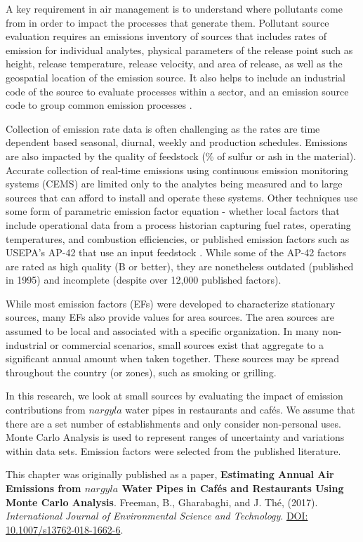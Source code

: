 A key requirement in air management is to understand where pollutants come from in order to impact the processes that generate them. Pollutant source evaluation requires an emissions inventory of sources that includes rates of emission for individual analytes, physical parameters of the release point such as height, release temperature, release velocity, and area of release, as well as the geospatial location of the emission source. It also helps to include an industrial code of the source to evaluate processes within a sector, and an emission source code to group common emission processes \citep{The2008}.

Collection of emission rate data is often challenging as the rates are time dependent based seasonal, diurnal, weekly and production schedules. Emissions are also impacted by the quality of feedstock (\% of sulfur or ash in the material). Accurate collection of real-time emissions using continuous emission monitoring systems (CEMS) are limited only to the analytes being measured and to large sources that can afford to install and operate these systems. Other techniques use some form of parametric emission factor equation - whether local factors that include operational data from a process historian capturing fuel rates, operating temperatures, and combustion efficiencies, or published emission factors such as USEPA's AP-42 that use an input feedstock \citep{USEPA1995}. While some of the AP-42 factors are rated as high quality (B or better), they are nonetheless outdated (published in 1995) and incomplete (despite over 12,000 published factors).

While most emission factors (EFs) were developed to characterize stationary sources, many EFs also provide values for area sources. The area sources are assumed to be local and associated with a specific organization. In many non-industrial or commercial scenarios, small sources exist that aggregate to a significant annual amount when taken together.  These sources may be spread throughout the country (or zones), such as smoking or grilling.

In this research, we look at small sources by evaluating the impact of emission contributions from $nargyla$ water pipes in restaurants and caf\'es. We assume that there are a set number of establishments and only consider non-personal uses.  Monte Carlo Analysis is used to represent ranges of uncertainty and variations within data sets. Emission factors were selected from the published literature.

This chapter was originally published as a paper,  \textbf{Estimating Annual Air Emissions from $nargyla$ Water Pipes in Caf\'es and Restaurants Using Monte Carlo Analysis}. Freeman, B., Gharabaghi, and J.  Th\'e, (2017). \textit{International Journal of Environmental Science and Technology}. \url{DOI: 10.1007/s13762-018-1662-6}.

